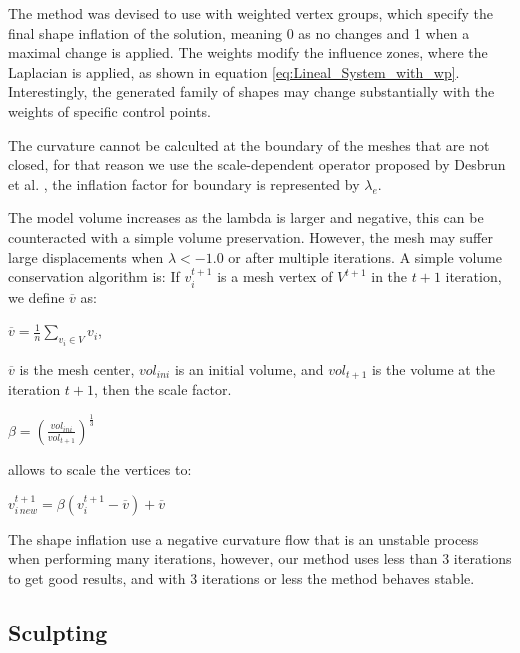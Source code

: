 \documentclass[10pt, conference]{IEEEtran}
\begin{document}
The method was devised to use with weighted vertex groups, which specify
the final shape inflation of the solution, meaning $0$ as no changes
and 1 when a maximal change is applied. The weights modify the influence
zones, where the Laplacian is applied, as shown in equation \ref{eq:Lineal_System_with_wp}.
Interestingly, the generated family of shapes may change substantially
with the weights of specific control points.

The curvature cannot be calculted at the boundary of the meshes that
are not closed, for that reason we use the scale-dependent operator
proposed by Desbrun et al. \cite{Desbrun1999}, the inflation factor
for boundary is represented by $\lambda_{e}$.

The model volume increases as the lambda is larger and negative, this
can be counteracted with a simple volume preservation. However, the
mesh may suffer large displacements when $\lambda<-1.0$ or after
multiple iterations. A simple volume conservation algorithm is: If
$v_{i}^{t+1}$ is a mesh vertex of $V^{t+1}$ in the $t+1$ iteration,
we define $\overline{v}$ as:

\begin{center}
$\overline{v}=\frac{1}{n}\underset{v_{i}\in V}{\sum}v_{i}$, 
\par\end{center}

$\overline{v}$ is the mesh center, $vol_{ini}$ is an initial volume,
and $vol_{t+1}$ is the volume at the iteration $t+1$, then the scale
factor.

\begin{center}
$\beta=\left(\frac{vol_{ini}}{vol_{t+1}}\right)^{\frac{1}{3}}$
\par\end{center}

allows to scale the vertices to:

\begin{center}
$v_{i\, new}^{t+1}=\beta\left(v_{i}^{t+1}-\overline{v}\right)+\overline{v}$
\par\end{center}

The shape inflation use a negative curvature flow that is an unstable process 
when performing many iterations, however, our method uses less than 3 
iterations to get good results, and with 3 iterations or less the method behaves stable.

\subsection{Sculpting\label{sub:Sculpting}}
\end{document}
